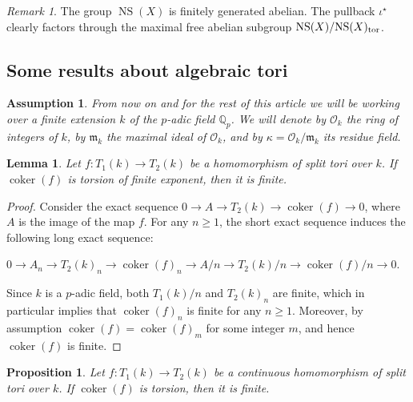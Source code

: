 \documentclass[12pt]{amsart}
\newtheorem{prop}[prop]{Proposition}
\newtheorem{lem}[lem]{Lemma}
\newtheorem{ass}[ass]{Assumption}
\theoremstyle{remark}
\newtheorem{rem}[rem]{Remark}
\newcommand{\sO}{{\mathcal O}}
\newcommand{\Q}{{\mathbb Q}}
\renewcommand{\1}{{\mathbb{S}}}
\newcommand{\NS}{{\operatorname{NS}}}
\newcommand{\<}{\langle}
\renewcommand{\>}{\rangle}
\newcommand{\cok}{{\operatorname{coker}}}
\newcommand{\tor}{{\rm tor}}
\begin{document}
\begin{rem}\label{NSXfree}
   The group $\NS(X)$ is finitely generated abelian.  The pullback $\iota^\star$ clearly factors through the maximal free abelian subgroup $\NS(X)/\NS(X)_{\tor}$.  
\end{rem}
	
\subsection{Some results about algebraic tori}	
\begin{ass}\label{Assumption}
From now on and for the rest of this article we will be working over a finite extension $k$ of the $p$-adic field $\Q_p$. We will denote by $\sO_k$ the ring of integers of $k$,  by $\mathfrak{m}_k$ the maximal ideal of $\sO_k$, and by $\kappa=\sO_k/\mathfrak{m}_k$ its residue field. 
\end{ass} 

\begin{lem}\label{lem:torus0} Let $f:T_1(k)\to T_2(k)$ be a homomorphism of split tori over $k$. If $\cok(f)$ is torsion of finite exponent, then it is finite. 
\end{lem}
\begin{proof}
	Consider the  exact sequence $0 \rightarrow A \rightarrow T_{2}(k)
 \rightarrow \cok(f) \rightarrow 0$, where $A$ is the image of the map $f$. For any $n \geq 1$, the short exact sequence induces the following long exact sequence:
 \begin{center}
 	 $0 \rightarrow A_n \rightarrow T_{2}(k)_n \rightarrow \cok(f)_{n} \rightarrow A/n \rightarrow T_{2}(k)/n  \rightarrow \cok(f)/n \rightarrow 0 $.
 \end{center}
 Since $k$ is a $p$-adic field, both $T_{1}(k)/n$ and $T_{2}(k)_{n}$ are finite, which in particular implies that $\cok(f)_{n}$ is finite for any $n \geq 1$. Moreover, by assumption $\cok(f) = \cok(f)_{m}$ for some integer $m $,  and hence $\cok(f)$ is finite.
 
 
 
 
   \end{proof}

	
\begin{prop}\label{prop:torus1} Let $f:T_1(k)\to T_2(k)$ be a  continuous homomorphism of split tori over $k$. If $\cok(f)$ is torsion, then it is finite. 
\end{prop}
\end{document}
